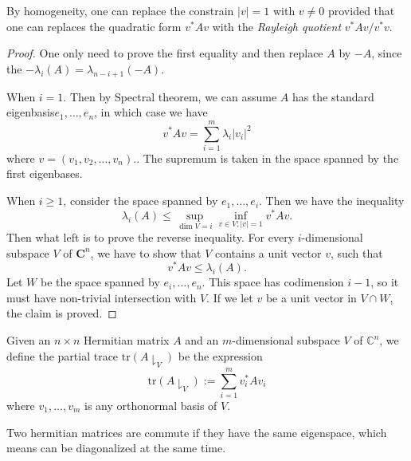 \begin{remark}
    By homogeneity, one can replace the constrain $|v|=1$ with $v\neq0$ provided that one can replaces the quadratic form $v^*Av$ with the \textit{Rayleigh quotient} $v^*Av/v^*v$.
\end{remark}

\begin{proof}
    One only need to prove the first equality and then replace $A$ by $-A$, since the $-\lambda_i(A) = \lambda_{n-i+1}(-A)$.

    When $i=1$. Then by Spectral theorem, we can assume $A$ has the standard eigenbasis$e_1,\dots,e_n$, in which case we have
    \begin{equation}\label{C-F minimax proof}
        v^*Av = \sum_{i=1}^m \lambda_i|v_i|^2
    \end{equation}
    where $v=(v_1,v_2,\dots,v_n).$. The supremum is taken in the space spanned by the first eigenbases.

    When $i\geq 1$, consider the space spanned by $e_1,\dots,e_i$. Then we have the inequality 
    \begin{equation*}
        \lambda_i(A)\leq \sup_{\dim V =i} \inf_{v\in V:|v|=1} v^*Av.
    \end{equation*}
    Then what left is to prove the reverse inequality. For every $i$-dimensional subspace $V$ of $\mathbf C^n$, we have to show that $V$ contains a unit vector $v$, such that
    \begin{equation*}
        v^*Av\leq \lambda_i(A).
    \end{equation*}
    Let $W$ be the space spanned by $e_i,\dots,e_n$. This space has codimension $i-1$, so it must have non-trivial intersection with $V$. If we let $v$ be a unit vector in $V\cap W$, the claim is proved.
    
\end{proof}

\begin{definition}
    Given an $n\times n$ Hermitian matrix $A$ and an $m$-dimensional subspace $V$ of $\mathbb C^n$, we define the partial trace $\mathrm{tr}(A\downharpoonright_V)$ be the expression
    \begin{equation*}
        \mathrm{tr}(A\downharpoonright_V):=\sum_{i=1}^m v_i^*Av_i
    \end{equation*}
    where $v_1,\dots,v_m$ is any orthonormal basis of $V$.
\end{definition}

\begin{lemma}
    Two hermitian matrices are commute if they have the same eigenspace, which means can be diagonalized at the same time.
\end{lemma}

